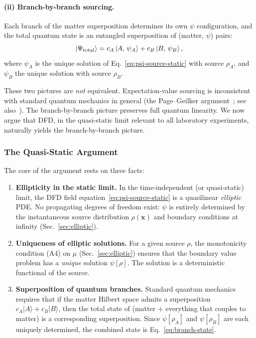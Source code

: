 \paragraph{(ii) Branch-by-branch sourcing.}
Each branch of the matter superposition determines its own $\psi$ configuration, and the total quantum state is an entangled superposition of (matter, $\psi$) pairs:
\begin{equation}\label{eq:branch-state}
|\Psi_{\rm total}\rangle = c_A\,|A,\,\psi_A\rangle + c_B\,|B,\,\psi_B\rangle\,,
\end{equation}
where $\psi_A$ is the unique solution of Eq.~\eqref{eq:psi-source-static} with source $\rho_A$, and $\psi_B$ the unique solution with source $\rho_B$.

These two pictures are \emph{not} equivalent.  Expectation-value sourcing is inconsistent with standard quantum mechanics in general (the Page--Geilker argument~\cite{PageGeilker1981}; see also~\cite{EppleyHannah1977,Carlip2008}).  The branch-by-branch picture preserves full quantum linearity.  We now argue that DFD, in the quasi-static limit relevant to all laboratory experiments, naturally yields the branch-by-branch picture.

\subsubsection{The Quasi-Static Argument}

The core of the argument rests on three facts:

\begin{enumerate}
\item \textbf{Ellipticity in the static limit.}  In the time-independent (or quasi-static) limit, the DFD field equation~\eqref{eq:psi-source-static} is a quasilinear \emph{elliptic} PDE.  No propagating degrees of freedom exist: $\psi$ is entirely determined by the instantaneous source distribution $\rho(\mathbf{x})$ and boundary conditions at infinity (Sec.~\ref{sec:elliptic}).

\item \textbf{Uniqueness of elliptic solutions.}  For a given source $\rho$, the monotonicity condition (A4) on $\mu$ (Sec.~\ref{sec:elliptic}) ensures that the boundary value problem has a \emph{unique} solution $\psi[\rho]$.  The solution is a deterministic functional of the source.

\item \textbf{Superposition of quantum branches.}  Standard quantum mechanics requires that if the matter Hilbert space admits a superposition $c_A|A\rangle + c_B|B\rangle$, then the total state of (matter $+$ everything that couples to matter) is a corresponding superposition.  Since $\psi[\rho_A]$ and $\psi[\rho_B]$ are each uniquely determined, the combined state is Eq.~\eqref{eq:branch-state}.
\end{enumerate}

